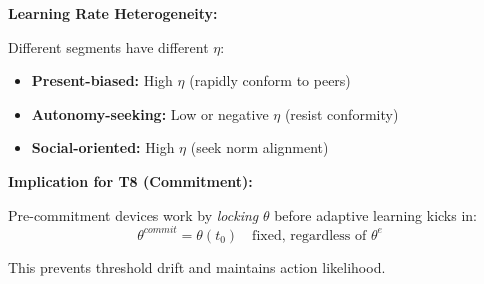 \begin{tcolorbox}[colback=purple!5!white, colframe=purple!75!black,
    title=\textbf{Extension UNTCM-X3: Adaptive Expectations for Threshold}]
\textbf{Learning Rate Heterogeneity:}

Different segments have different $\eta$:
\begin{itemize}[nosep]
\item \textbf{Present-biased:} High $\eta$ (rapidly conform to peers)
\item \textbf{Autonomy-seeking:} Low or negative $\eta$ (resist conformity)
\item \textbf{Social-oriented:} High $\eta$ (seek norm alignment)
\end{itemize}

\textbf{Implication for T8 (Commitment):}

Pre-commitment devices work by \emph{locking} $\theta$ before adaptive learning kicks in:
\begin{equation}
\theta^{commit} = \theta(t_0) \quad \text{fixed, regardless of } \theta^e
\end{equation}

This prevents threshold drift and maintains action likelihood.

\end{tcolorbox}

